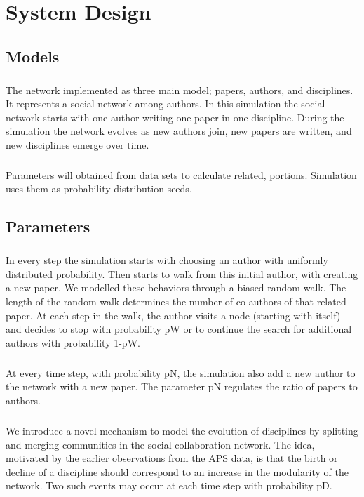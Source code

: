 \chapter{System Design}
\section{Models}
\paragraph{}
The network implemented as three main model; papers, authors, and disciplines.
It represents a social network among authors.
In this simulation the social network starts with one author writing one paper in one discipline.
During the simulation the network evolves as new authors join, new papers are written, and new disciplines emerge over time.
\paragraph{}
Parameters will obtained from data sets to calculate related, portions.
Simulation uses them as probability distribution seeds.
\section{Parameters}
\paragraph{}
In every step the simulation starts with choosing an author with uniformly distributed probability.
Then starts to walk from this initial author, with creating a new paper.
We modelled these behaviors through a biased random walk. 
The length of the random walk determines the number of co-authors of that related paper. 
At each step in the walk, the author visits a node (starting with itself) and decides to stop with probability pW or to continue the search for additional authors with probability 1-pW.
\paragraph{}
At every time step, with probability pN, the simulation also add a new author to the network with a new paper. 
The parameter pN regulates the ratio of papers to authors.
\paragraph{}
We introduce a novel mechanism to model the evolution of disciplines by splitting and merging communities in the social collaboration network.
The idea, motivated by the earlier observations from the APS data, is that the birth or decline of a discipline should correspond to an increase in the modularity of the network.
Two such events may occur at each time step with probability pD.